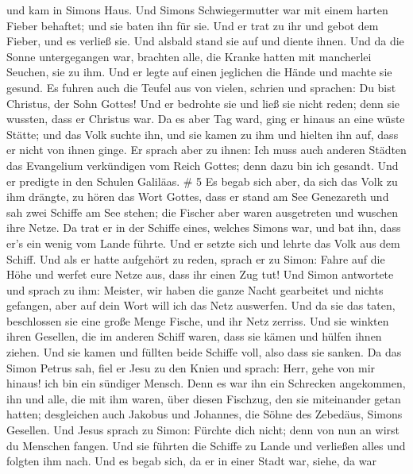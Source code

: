 und kam in Simons Haus. Und Simons Schwiegermutter war mit einem harten
Fieber behaftet; und sie baten ihn für sie.  Und er trat zu
ihr und gebot dem Fieber, und es verließ sie. Und alsbald stand sie auf
und diente ihnen.  Und da die Sonne untergegangen war,
brachten alle, die Kranke hatten mit mancherlei Seuchen, sie zu ihm. Und
er legte auf einen jeglichen die Hände und machte sie gesund.
 Es fuhren auch die Teufel aus von vielen, schrien und
sprachen: Du bist Christus, der Sohn Gottes! Und er bedrohte sie und
ließ sie nicht reden; denn sie wussten, dass er Christus war.
 Da es aber Tag ward, ging er hinaus an eine wüste Stätte;
und das Volk suchte ihn, und sie kamen zu ihm und hielten ihn auf, dass
er nicht von ihnen ginge.  Er sprach aber zu ihnen: Ich
muss auch anderen Städten das Evangelium verkündigen vom Reich Gottes;
denn dazu bin ich gesandt.  Und er predigte in den Schulen
Galiläas. \# 5  Es begab sich aber, da sich das Volk zu ihm
drängte, zu hören das Wort Gottes, dass er stand am See Genezareth
 und sah zwei Schiffe am See stehen; die Fischer aber waren
ausgetreten und wuschen ihre Netze.  Da trat er in der
Schiffe eines, welches Simons war, und bat ihn, dass er's ein wenig vom
Lande führte. Und er setzte sich und lehrte das Volk aus dem Schiff.
 Und als er hatte aufgehört zu reden, sprach er zu Simon:
Fahre auf die Höhe und werfet eure Netze aus, dass ihr einen Zug tut!
 Und Simon antwortete und sprach zu ihm: Meister, wir haben
die ganze Nacht gearbeitet und nichts gefangen, aber auf dein Wort will
ich das Netz auswerfen.  Und da sie das taten, beschlossen
sie eine große Menge Fische, und ihr Netz zerriss.  Und sie
winkten ihren Gesellen, die im anderen Schiff waren, dass sie kämen und
hülfen ihnen ziehen. Und sie kamen und füllten beide Schiffe voll, also
dass sie sanken.  Da das Simon Petrus sah, fiel er Jesu zu
den Knien und sprach: Herr, gehe von mir hinaus! ich bin ein sündiger
Mensch.  Denn es war ihn ein Schrecken angekommen, ihn und
alle, die mit ihm waren, über diesen Fischzug, den sie miteinander getan
hatten;  desgleichen auch Jakobus und Johannes, die Söhne
des Zebedäus, Simons Gesellen. Und Jesus sprach zu Simon: Fürchte dich
nicht; denn von nun an wirst du Menschen fangen.  Und sie
führten die Schiffe zu Lande und verließen alles und folgten ihm nach.
 Und es begab sich, da er in einer Stadt war, siehe, da war
